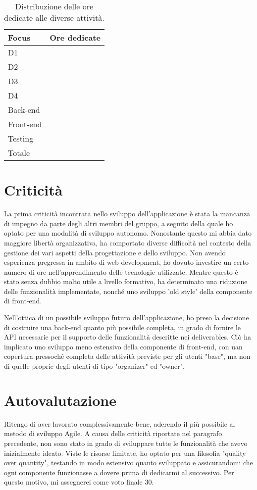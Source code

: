 \documentclass[9pt]{extarticle}
\begin{document}
\begin{table}[htb!]
	\centering
	\begin{tabular}{ll}
		Focus     & Ore dedicate \\\toprule
		D1        &              \\
		D2        &              \\
		D3        &              \\
		D4        &              \\
		Back-end  &              \\
		Front-end &              \\
		Testing   &              \\\midrule
		Totale    &              \\\bottomrule
	\end{tabular}
	\caption{Distribuzione delle ore dedicate alle diverse attività.}
	\label{table:ore}
\end{table}

\section{Criticità}

La prima criticità incontrata nello sviluppo dell'applicazione è stata
la mancanza di impegno da parte degli altri membri del gruppo, a
seguito della quale ho optato per una modalità di sviluppo autonomo.
Nonostante questo mi abbia dato maggiore libertà organizzativa, ha comportato
diverse difficoltà nel contesto della gestione dei vari aspetti della
progettazione e dello sviluppo. Non avendo esperienza pregressa in ambito di
web development, ho dovuto investire un certo numero di ore nell'apprendimento
delle tecnologie utilizzate. Mentre questo è stato senza dubbio molto utile
a livello formativo, ha determinato una riduzione delle funzionalità
implementate, nonché uno sviluppo 'old style' della componente di front-end.

Nell'ottica di un possibile sviluppo futuro dell'applicazione, ho preso la decisione di costruire una back-end quanto più possibile completa, in grado di fornire le API necessarie per il supporto delle funzionalità descritte nei deliverables. Ciò ha implicato uno sviluppo meno estensivo della componente di front-end, con uan copertura pressoché completa delle attività previste per gli utenti "base", ma non di quelle proprie degli utenti di tipo "organizer" ed "owner".


\section{Autovalutazione}

Ritengo di aver lavorato complessivamente bene, aderendo il più possibile al metodo di sviluppo Agile. A causa delle criticità riportate nel paragrafo precedente, non sono stato in grado di sviluppare tutte le funzionalità che avevo inizialmente ideato. Viste le risorse limitate, ho optato per una filosofia "quality over quantity", testando in modo estensivo quanto sviluppato e assicurandomi che ogni componente funzionasse a dovere prima di dedicarmi al successivo. Per questo motivo, mi assegnerei come voto finale 30.
\end{document}
